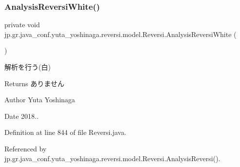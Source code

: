 \subsubsection{\texorpdfstring{Analysis\+Reversi\+White()}{AnalysisReversiWhite()}}
{\footnotesize\ttfamily private void jp.\+gr.\+java\+\_\+conf.\+yuta\+\_\+yoshinaga.\+reversi.\+model.\+Reversi.\+Analysis\+Reversi\+White (\begin{DoxyParamCaption}{ }\end{DoxyParamCaption})\hspace{0.3cm}{\ttfamily [private]}}



解析を行う(白) 

\begin{DoxyReturn}{Returns}
ありません 
\end{DoxyReturn}
\begin{DoxyAuthor}{Author}
Yuta Yoshinaga 
\end{DoxyAuthor}
\begin{DoxyDate}{Date}
2018.. 
\end{DoxyDate}


Definition at line 844 of file Reversi.\+java.



Referenced by jp.\+gr.\+java\+\_\+conf.\+yuta\+\_\+yoshinaga.\+reversi.\+model.\+Reversi.\+Analysis\+Reversi().


